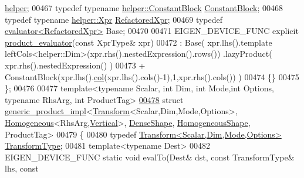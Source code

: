\begin{DoxyCode}
       \hyperlink{struct_eigen_1_1internal_1_1homogeneous__left__product__refactoring__helper}{helper};
00467   \textcolor{keyword}{typedef} \textcolor{keyword}{typename} \hyperlink{group___core___module_class_eigen_1_1_replicate}{helper::ConstantBlock} \hyperlink{group___core___module_class_eigen_1_1_replicate}{ConstantBlock};
00468   \textcolor{keyword}{typedef} \textcolor{keyword}{typename} \hyperlink{group___core___module_class_eigen_1_1_cwise_binary_op}{helper::Xpr} \hyperlink{group___core___module_class_eigen_1_1_cwise_binary_op}{RefactoredXpr};
00469   \textcolor{keyword}{typedef} \hyperlink{struct_eigen_1_1internal_1_1evaluator}{evaluator<RefactoredXpr>} Base;
00470   
00471   EIGEN\_DEVICE\_FUNC \textcolor{keyword}{explicit} \hyperlink{struct_eigen_1_1internal_1_1product__evaluator}{product\_evaluator}(\textcolor{keyword}{const} XprType& xpr)
00472     : Base(   xpr.lhs().template leftCols<helper::Dim>(xpr.rhs().nestedExpression().rows()) .lazyProduct( 
      xpr.rhs().nestedExpression() )
00473             + ConstantBlock(xpr.lhs().\hyperlink{group___sparse_core___module_a3531e3e2098507a069a368d72d46471e}{col}(xpr.lhs().cols()-1),1,xpr.rhs().cols()) )
00474   \{\}
00475 \};
00476 
00477 \textcolor{keyword}{template}<\textcolor{keyword}{typename} Scalar, \textcolor{keywordtype}{int} Dim, \textcolor{keywordtype}{int} Mode,\textcolor{keywordtype}{int} Options, \textcolor{keyword}{typename} RhsArg, \textcolor{keywordtype}{int} ProductTag>
\hyperlink{struct_eigen_1_1internal_1_1generic__product__impl_3_01_transform_3_01_scalar_00_01_dim_00_01_mo9dee7991850e2cedf8646fca36129af2}{00478} \textcolor{keyword}{struct }\hyperlink{struct_eigen_1_1internal_1_1generic__product__impl}{generic\_product\_impl}<\hyperlink{group___geometry___module_class_eigen_1_1_transform}{Transform}<Scalar,Dim,Mode,Options>, 
      \hyperlink{group___geometry___module_class_eigen_1_1_homogeneous}{Homogeneous}<RhsArg,\hyperlink{group__enums_ggad49a7b3738e273eb00932271b36127f7addca718e0564723df21d61b94b1198be}{Vertical}>, \hyperlink{struct_eigen_1_1_dense_shape}{DenseShape}, 
      \hyperlink{struct_eigen_1_1_homogeneous_shape}{HomogeneousShape}, ProductTag>
00479 \{
00480   \textcolor{keyword}{typedef} \hyperlink{group___geometry___module_class_eigen_1_1_transform}{Transform<Scalar,Dim,Mode,Options>} 
      \hyperlink{group___geometry___module_class_eigen_1_1_transform}{TransformType};
00481   \textcolor{keyword}{template}<\textcolor{keyword}{typename} Dest>
00482   EIGEN\_DEVICE\_FUNC \textcolor{keyword}{static} \textcolor{keywordtype}{void} evalTo(Dest& dst, \textcolor{keyword}{const} TransformType& lhs, \textcolor{keyword}{const} 

\end{DoxyCode}
